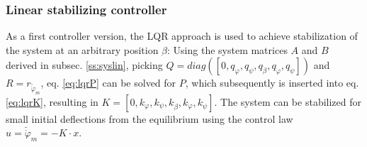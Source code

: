 \documentclass{article}
\begin{document}
\subsubsection{Linear stabilizing controller}
As a first controller version, the LQR approach is used to achieve stabilization of the system at an arbitrary position $\beta$:
Using the system matrices $A$ and $B$ derived in subsec. \ref{ss:syslin}, picking $Q = diag \left( \left[0, q_{\varphi}, q_{\psi}, q_{\dot{\beta}}, q_{\dot{\varphi}}, q_{\dot{\psi}} \right] \right)$ and $R = r_{\breve{\dot{\varphi}}_m}$, eq. \ref{eq:lqrP} can be solved for $P$, which subsequently is inserted into eq. \ref{eq:lqrK}, resulting in $K = \left[0, k_{\varphi}, k_{\psi}, k_{\dot{\beta}}, k_{\dot{\varphi}}, k_{\dot{\psi}} \right]$.
The system can be stabilized for small initial deflections from the equilibrium using the control law $u=\breve{\dot{\varphi}}_m=-K \cdot x$.
\end{document}
